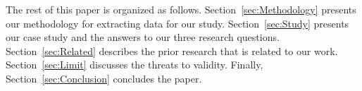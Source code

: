 The rest of this paper is organized as follows. Section~\ref{sec:Methodology} presents our methodology for extracting data for our study. Section~\ref{sec:Study} presents our case study and the answers to our three research questions. Section~\ref{sec:Related} describes the prior research that is related to our work. Section~\ref{sec:Limit}  discusses the threats to validity. Finally, Section~\ref{sec:Conclusion} concludes the paper.


